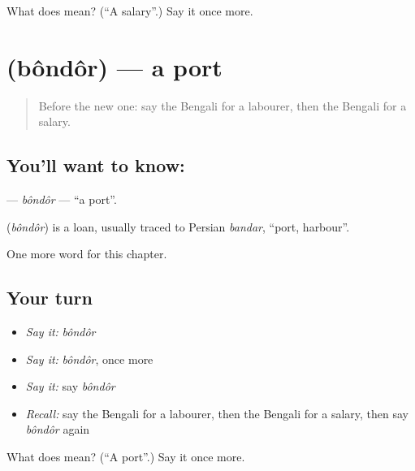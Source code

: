 \begin{tcolorbox}[breakable,colback=teal!4,colframe=teal!35!black,title={Before you move on}]
What does  mean? (\textquotedblleft{}A salary\textquotedblright{}.) Say it once more.
\end{tcolorbox}
\section[\texorpdfstring{\bn{বন্দর} (bôndôr)}{বন্দর (bôndôr)}]{ (bôndôr) — a port}

\label{lesson:BN-C128-bondor}



\begin{quote}
Before the new one: say the Bengali for a labourer, then the Bengali for a salary.
\end{quote}

\subsection*{You'll want to know: }
\textbf{} — \emph{bôndôr} — \textquotedblleft{}a port\textquotedblright{}.

\begin{cousinweb}
\textbf{} (\emph{bôndôr}) is a loan, usually traced to Persian \emph{bandar}, \textquotedblleft{}port, harbour\textquotedblright{}.
\end{cousinweb}

\begin{grammarlens}[title={What you've built}]
One more word for this chapter.
\end{grammarlens}

\subsection*{Your turn}
\begin{itemize}
\raggedright
  \item \emph{Say it:} \emph{bôndôr}
  \item \emph{Say it:} \emph{bôndôr}, once more
  \item \emph{Say it:} say \emph{bôndôr}
  \item \emph{Recall:} say the Bengali for a labourer, then the Bengali for a salary, then say \emph{bôndôr} again
\end{itemize}

\begin{tcolorbox}[breakable,colback=teal!4,colframe=teal!35!black,title={Before you move on}]
What does  mean? (\textquotedblleft{}A port\textquotedblright{}.) Say it once more.
\end{tcolorbox}
